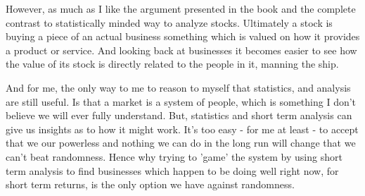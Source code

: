 \documentclass[12pt]{article}
\begin{document}
    However, as much as I like the argument presented in the book and the complete contrast to 
    statistically minded way to analyze stocks. Ultimately a stock is buying a piece of an 
    actual business something which is valued on how it provides a product or service. And 
    looking back at businesses it becomes easier to see how the value of its stock is directly 
    related to the people in it, manning the ship.

    And for me, the only way to me to reason to myself that statistics, and analysis are still 
    useful. Is that a market is a system of people, which is something I don't believe we will 
    ever fully understand. But, statistics and short term analysis can give us insights as to 
    how it might work. It's too easy - for me at least - to accept that we our powerless and 
    nothing we can do in the long run will change that we can't beat randomness. Hence why
    trying to 'game' the system by using short term analysis to find businesses which happen
    to be doing well right now, for short term returns, is the only option we have against
    randomness.

\pagebreak


\end{document}
